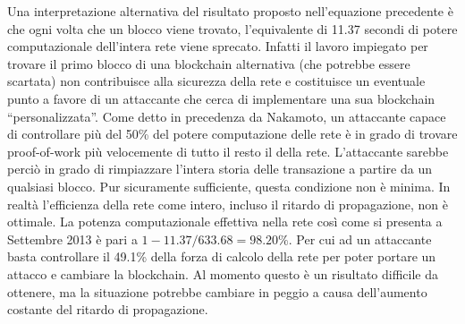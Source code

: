 Una interpretazione alternativa del risultato proposto nell'equazione precedente è che ogni volta che un blocco viene trovato, l'equivalente di 11.37 secondi di potere computazionale dell'intera rete viene sprecato. Infatti il lavoro impiegato per trovare il primo blocco di una blockchain alternativa (che potrebbe essere scartata) non contribuisce alla sicurezza della rete e costituisce un eventuale punto a favore di un attaccante che cerca di implementare una sua blockchain ``personalizzata''. Come detto in precedenza da Nakamoto, un attaccante capace di controllare più del 50\% del potere computazione delle rete è in grado di trovare proof-of-work più velocemente di tutto il resto il della rete. L'attaccante sarebbe perciò in grado di rimpiazzare l'intera storia delle transazione a partire da un qualsiasi blocco. Pur sicuramente sufficiente, questa condizione non è minima. In realtà l'efficienza della rete come intero, incluso il ritardo di propagazione, non è ottimale. La potenza computazionale effettiva nella rete così come si presenta a Settembre 2013 è pari a $1 - 11.37 / 633.68 = 98.20\%$. Per cui ad un attaccante basta controllare il 49.1\% della forza di calcolo della rete per poter portare un attacco e cambiare la blockchain. Al momento questo è un risultato difficile da ottenere, ma la situazione potrebbe cambiare in peggio a causa dell'aumento costante del ritardo di propagazione.
